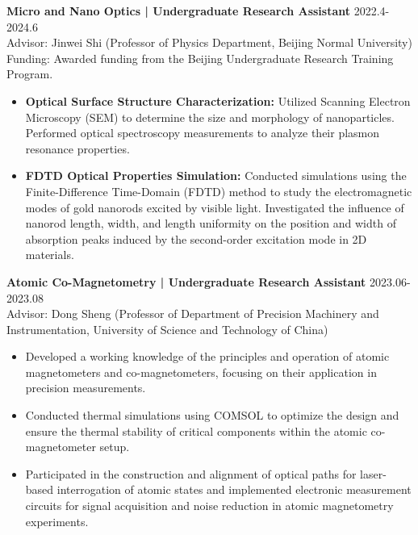 \documentclass[10pt]{article}
\begin{document}
\noindent \textbf{Micro and Nano Optics | Undergraduate Research Assistant} \hfill 2022.4-2024.6\\
\noindent Advisor: Jinwei Shi (Professor of Physics Department, Beijing Normal University)\\
\noindent Funding: Awarded funding from the Beijing Undergraduate Research Training Program.\\
\begin{itemize}
    \item \textbf{Optical Surface Structure Characterization:} Utilized Scanning Electron Microscopy (SEM) to determine the size and morphology of nanoparticles. Performed optical spectroscopy measurements to analyze their plasmon resonance properties.
    \item \textbf{FDTD Optical Properties Simulation:} Conducted simulations using the Finite-Difference Time-Domain (FDTD) method to study the electromagnetic modes of gold nanorods excited by visible light. Investigated the influence of nanorod length, width, and length uniformity on the position and width of absorption peaks induced by the second-order excitation mode in 2D materials.
\end{itemize}\vspace{5pt}

\noindent \textbf{Atomic Co-Magnetometry | Undergraduate Research Assistant} \hfill 2023.06-2023.08\\
\noindent Advisor: Dong Sheng (Professor of Department of Precision Machinery and Instrumentation, University of Science and Technology of China)\\
\begin{itemize}
    \item Developed a working knowledge of the principles and operation of atomic magnetometers and co-magnetometers, focusing on their application in precision measurements.
    \item Conducted thermal simulations using COMSOL to optimize the design and ensure the thermal stability of critical components within the atomic co-magnetometer setup.
    \item Participated in the construction and alignment of optical paths for laser-based interrogation of atomic states and implemented electronic measurement circuits for signal acquisition and noise reduction in atomic magnetometry experiments.
\end{itemize}\vspace{10pt}
\end{document}
